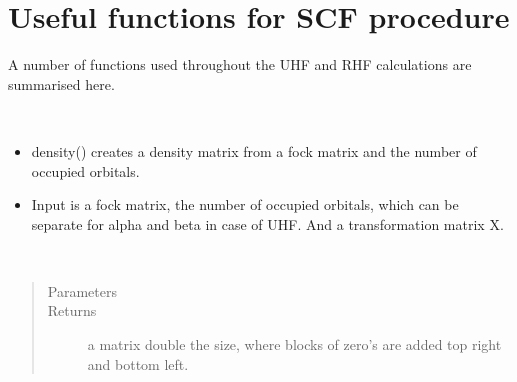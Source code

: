 \documentclass[letterpaper,10pt,english]{sphinxmanual}
\begin{document}
\chapter{Useful functions for SCF procedure}
\label{\detokenize{SCF_functions:useful-functions-for-scf-procedure}}\label{\detokenize{SCF_functions::doc}}
A number of functions used throughout the UHF and RHF calculations are summarised here.

\begin{fulllineitems}
\label{\detokenize{SCF_functions:ghf.SCF_functions.density_matrix}}~\begin{itemize}
\item {} 
density() creates a density matrix from a fock matrix and the number of occupied orbitals.

\item {} 
Input is a fock matrix, the number of occupied orbitals, which can be separate for alpha and beta in case of UHF.
And a transformation matrix X.

\end{itemize}

\end{fulllineitems}


\begin{fulllineitems}
\label{\detokenize{SCF_functions:ghf.SCF_functions.expand_matrix}}~\begin{quote}\begin{description}
\item[{Parameters}] \leavevmode
{} \textendash{} 

\item[{Returns}] \leavevmode
a matrix double the size, where blocks of zero’s are added top right and bottom left.

\end{description}\end{quote}

\end{fulllineitems}
\end{document}
